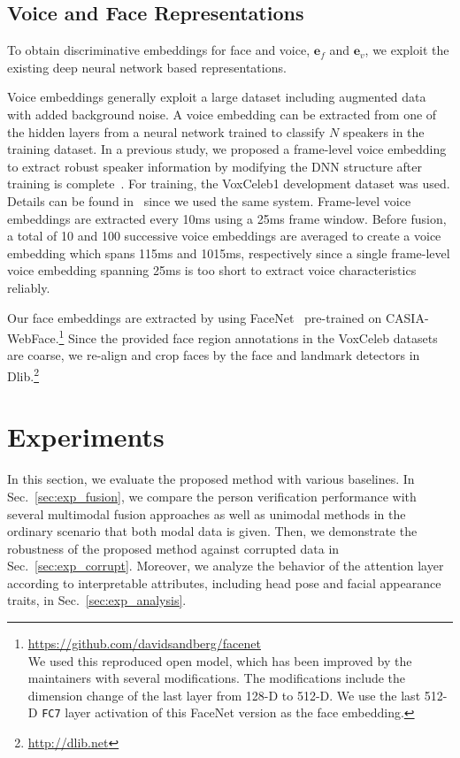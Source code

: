 \documentclass{article}
\begin{document}
\subsection{Voice and Face Representations}
To obtain discriminative embeddings for face and voice, $\mathbf{e}_f$ and $\mathbf{e}_v$, 
we exploit the existing deep neural network based representations.

Voice embeddings generally exploit a large dataset including augmented data with added background noise. 
A voice embedding can be extracted from one of the hidden layers from a neural network trained to classify $N$ speakers in the training dataset. In a previous study, we proposed a frame-level voice embedding to extract robust speaker information by modifying the DNN structure after training is complete~\cite{Shon2018frame}. For training, the VoxCeleb1 development dataset was used. 
Details can be found in~\cite{Shon2018frame} since we used the same system.
Frame-level voice embeddings are extracted every 10ms using a 25ms frame window. 
Before fusion, a total of 10 and 100 successive voice embeddings are averaged to create a voice embedding which spans 115ms and 1015ms, respectively since a single frame-level voice embedding spanning 25ms is too short to extract voice characteristics reliably. 

Our face embeddings are extracted by using  FaceNet~\cite{Schroff2015} pre-trained on CASIA-WebFace.\footnote{\url{https://github.com/davidsandberg/facenet}\\ We used this reproduced open model, which has been improved by the maintainers with several modifications.
The modifications include the dimension change of the last layer from 128-D to 512-D. We use the last 512-D \texttt{FC7} layer activation of this FaceNet version as the face embedding.}
Since the provided face region annotations in the VoxCeleb datasets are coarse, 
we re-align and crop faces by the face and landmark detectors in Dlib.\footnote{\url{http://dlib.net}}




\section{Experiments}
In this section, we evaluate the proposed method with various baselines. 
In Sec.~\ref{sec:exp_fusion}, we compare the person verification performance with several multimodal fusion approaches as well as unimodal methods in the ordinary scenario that both modal data is given.
Then, we demonstrate the robustness of the proposed method against corrupted data in Sec.~\ref{sec:exp_corrupt}.
Moreover, we analyze the behavior of the attention layer according to interpretable attributes, including head pose and facial appearance traits, in Sec.~\ref{sec:exp_analysis}.
\end{document}
